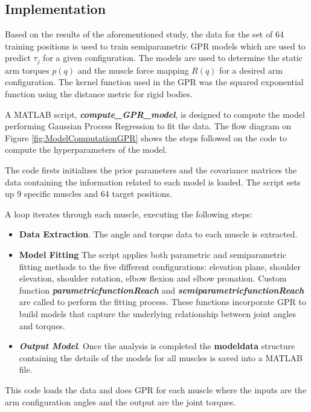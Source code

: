 \subsection{Implementation}

Based on the results of the aforementioned study, the data for the set of 64 training positions is used to train semiparametric GPR models which are used to predict $\tau_j$ for a given configuration. The models are used to determine the static arm torques $p(q)$ and the muscle force mapping $R(q)$ for a desired arm configuration.
The kernel function used in the GPR was the squared exponential function using the distance metric for rigid bodies. 

A MATLAB script, \textbf{\textit{compute\_GPR\_model}}, is designed to compute the model performing Gaussian Process Regression to fit the data. The flow diagram on Figure \ref{fig:ModelComputationGPR} shows the steps followed on the code to compute the hyperparameters of the model.

The code firsts initializes the prior parameters and the covariance matrices the data containing the information related to each model is loaded. The script sets up 9 specific muscles and 64 target positions. 

A loop iterates through each muscle, executing the following steps:

\begin{itemize}
    \item \textbf{Data Extraction}. The angle and torque data to each muscle is extracted.
    \item \textbf{Model Fitting} The script applies both parametric and semiparametric fitting methods to the five different configurations: elevation plane, shoulder elevation, shoulder rotation, elbow flexion and elbow pronation. Custom function \textbf{\textit{parametricfunctionReach}} and \textbf{\textit{semiparametricfunctionReach}} are called to perform the fitting process. These functions incorporate GPR to build models that capture the underlying relationship between joint angles and torques.
    \item \textbf{\textit{Output Model}}. Once the analysis is completed the \textbf{modeldata} structure containing the details of the models for all muscles is saved into a MATLAB file. 
\end{itemize}

 
 This code loads the data and does GPR for each muscle where the inputs are the arm configuration angles and the output are the joint torques. 



